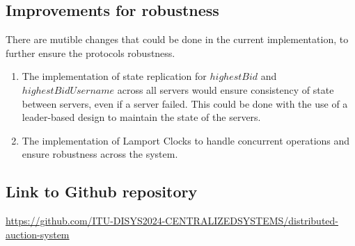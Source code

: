 \documentclass[a4paper,11pt]{article}
\begin{document}
\subsection{Improvements for robustness}
There are mutible changes that could be done in the current implementation, to further ensure the protocols robustness.\\
\begin{enumerate}
    \item The implementation of state replication for $highestBid$ and $highestBidUsername$ across all servers would ensure consistency of state between servers, even if a server failed. This could be done with the use of a leader-based design to maintain the state of the servers.
    \item The implementation of Lamport Clocks to handle concurrent operations and ensure robustness across the system.
\end{enumerate}

\subsection*{Link to Github repository}

\href{https://github.com/ITU-DISYS2024-CENTRALIZEDSYSTEMS/distributed-auction-system}{https://github.com/ITU-DISYS2024-CENTRALIZEDSYSTEMS/distributed-auction-system}
\end{document}
